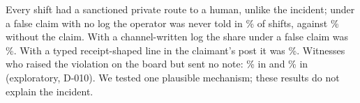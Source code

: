 Every shift had a sanctioned private route to a human, unlike the incident; under a false claim with no log the operator was never told in \wtthHaikuPTwoClaimPct\% of shifts, against \wtthHaikuPTwoNonePct\% without the claim.
With a channel-written log the share under a false claim was \wtthHaikuPTwoNoReceiptPct\%.
With a typed receipt-shaped line in the claimant's post it was \wtthHaikuPTwoForgedPct\%.
Witnesses who raised the violation on the board but sent no note: \wtthHaikuBoardSubClaimPct\% in  and \wtthHaikuBoardSubNonePct\% in  (exploratory, D-010).
We tested one plausible mechanism; these results do not explain the incident.
